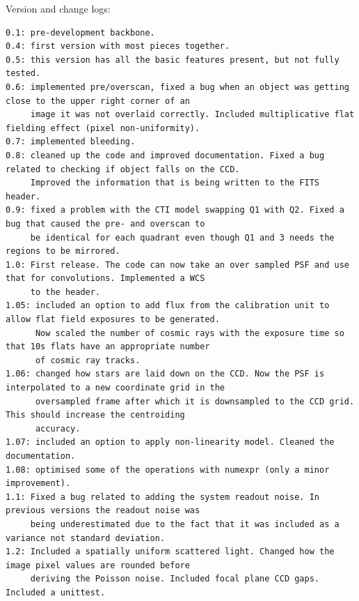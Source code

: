 \documentclass[a4paper,11pt,english]{sphinxmanual}
\begin{document}
Version and change logs:

\begin{Verbatim}[commandchars=\\\{\}]
0.1: pre-development backbone.
0.4: first version with most pieces together.
0.5: this version has all the basic features present, but not fully tested.
0.6: implemented pre/overscan, fixed a bug when an object was getting close to the upper right corner of an
     image it was not overlaid correctly. Included multiplicative flat fielding effect (pixel non-uniformity).
0.7: implemented bleeding.
0.8: cleaned up the code and improved documentation. Fixed a bug related to checking if object falls on the CCD.
     Improved the information that is being written to the FITS header.
0.9: fixed a problem with the CTI model swapping Q1 with Q2. Fixed a bug that caused the pre- and overscan to
     be identical for each quadrant even though Q1 and 3 needs the regions to be mirrored.
1.0: First release. The code can now take an over sampled PSF and use that for convolutions. Implemented a WCS
     to the header.
1.05: included an option to add flux from the calibration unit to allow flat field exposures to be generated.
      Now scaled the number of cosmic rays with the exposure time so that 10s flats have an appropriate number
      of cosmic ray tracks.
1.06: changed how stars are laid down on the CCD. Now the PSF is interpolated to a new coordinate grid in the
      oversampled frame after which it is downsampled to the CCD grid. This should increase the centroiding
      accuracy.
1.07: included an option to apply non-linearity model. Cleaned the documentation.
1.08: optimised some of the operations with numexpr (only a minor improvement).
1.1: Fixed a bug related to adding the system readout noise. In previous versions the readout noise was
     being underestimated due to the fact that it was included as a variance not standard deviation.
1.2: Included a spatially uniform scattered light. Changed how the image pixel values are rounded before
     deriving the Poisson noise. Included focal plane CCD gaps. Included a unittest.
\end{Verbatim}
\end{document}
